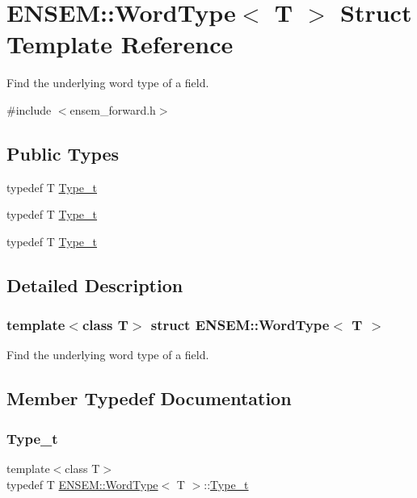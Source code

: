 \hypertarget{structENSEM_1_1WordType}{}\section{E\+N\+S\+EM\+:\+:Word\+Type$<$ T $>$ Struct Template Reference}
\label{structENSEM_1_1WordType}


Find the underlying word type of a field.  




{\ttfamily \#include $<$ensem\+\_\+forward.\+h$>$}

\subsection*{Public Types}
\begin{DoxyCompactItemize}
\item 
typedef T \mbox{\hyperlink{structENSEM_1_1WordType_a81392e736486edab6c96af6198ab8337}{Type\+\_\+t}}
\item 
typedef T \mbox{\hyperlink{structENSEM_1_1WordType_a81392e736486edab6c96af6198ab8337}{Type\+\_\+t}}
\item 
typedef T \mbox{\hyperlink{structENSEM_1_1WordType_a81392e736486edab6c96af6198ab8337}{Type\+\_\+t}}
\end{DoxyCompactItemize}


\subsection{Detailed Description}
\subsubsection*{template$<$class T$>$\newline
struct E\+N\+S\+E\+M\+::\+Word\+Type$<$ T $>$}

Find the underlying word type of a field. 

\subsection{Member Typedef Documentation}
\mbox{\label{structENSEM_1_1WordType_a81392e736486edab6c96af6198ab8337}} 
\subsubsection{\texorpdfstring{Type\_t}{Type\_t}\hspace{0.1cm}{\footnotesize\ttfamily [1/3]}}
{\footnotesize\ttfamily template$<$class T$>$ \\
typedef T \mbox{\hyperlink{structENSEM_1_1WordType}{E\+N\+S\+E\+M\+::\+Word\+Type}}$<$ T $>$\+::\mbox{\hyperlink{structENSEM_1_1WordType_a81392e736486edab6c96af6198ab8337}{Type\+\_\+t}}}

